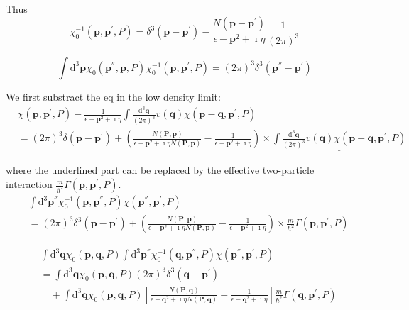 Thus
\[ \chi_0^{-1}(\mathbf{p},\mathbf{p}^{'},P) = \delta^3(\mathbf{p}-\mathbf{p}^{'}) - \frac{N(\mathbf{p}-\mathbf{p}^{'})}{\epsilon-\mathbf{p}^2+\imath \eta} \frac{1}{(2\pi)^3} \]

\[ \int \mathrm{d}^3 \mathbf{p} \chi_0(\mathbf{p}^{''},\mathbf{p},P)\chi_0^{-1}(\mathbf{p},\mathbf{p}^{'},P) = (2\pi)^3 \delta^3(\mathbf{p}^{''}-\mathbf{p}^{'})\]

We first substract the eq in the low density limit:
\[ \begin{split} &\chi(\mathbf{p},\mathbf{p}^{'},P) - \frac{1}{\epsilon-\mathbf{p}^2+\imath \eta} \int \frac{\mathrm{d}^3 \mathbf{q}}{(2\pi)^3} v(\mathbf{q}) \chi(\mathbf{p}-\mathbf{q},\mathbf{p}^{'},P)\\
&=(2\pi)^3 \delta(\mathbf{p}-\mathbf{p}^{'}) + \left( \frac{N(\mathbf{P},\mathbf{p})}{\epsilon - \mathbf{p}^2+\imath \eta N(\mathbf{P},\mathbf{p})} - \frac{1}{\epsilon - \mathbf{p}^2+\imath \eta} \right)\times \underline{\int \frac{\mathrm{d}^3 \mathbf{q}}{(2\pi)^3} v(\mathbf{q})\chi(\mathbf{p}-\mathbf{q},\mathbf{p}^{'},P)}
\end{split} \]

where the underlined part can be replaced by the effective two-particle interaction $\frac{m}{\hbar^2}\Gamma(\mathbf{p},\mathbf{p}^{'},P)$.
\[ \begin{split} &\int \mathrm{d}^3 \mathbf{p}^{''} \chi_0^{-1}(\mathbf{p},\mathbf{p}^{''},P)\chi(\mathbf{p}^{''},\mathbf{p}^{'},P)\\
&=(2\pi)^3 \delta^3(\mathbf{p}-\mathbf{p}^{'}) + \left( \frac{N(\mathbf{P},\mathbf{p})}{\epsilon - \mathbf{p}^2+\imath \eta N(\mathbf{P},\mathbf{p})} - \frac{1}{\epsilon - \mathbf{p}^2+\imath \eta} \right)\times\frac{m}{\hbar^2}\Gamma(\mathbf{p},\mathbf{p}^{'},P)
\end{split} \]

\[ \begin{split} &\int \mathrm{d}^3\mathbf{q} \chi_0(\mathbf{p},\mathbf{q},P) \int \mathrm{d}^3 \mathbf{p}^{''} \chi_0^{-1}(\mathbf{q},\mathbf{p}^{''},P)\chi(\mathbf{p}^{''},\mathbf{p}^{'},P)\\
&= \int \mathrm{d}^3\mathbf{q}\chi_0(\mathbf{p},\mathbf{q},P)(2\pi)^3\delta^3(\mathbf{q}-\mathbf{p}^{'})\\&\quad+ \int \mathrm{d}^3 \mathbf{q} \chi_0(\mathbf{p},\mathbf{q},P) \left[ \frac{N(\mathbf{P},\mathbf{q})}{\epsilon - \mathbf{q}^2+\imath \eta N(\mathbf{P},\mathbf{q})} - \frac{1}{\epsilon - \mathbf{q}^2+\imath \eta} \right] \frac{m}{\hbar^2} \Gamma(\mathbf{q},\mathbf{p}^{'},P)
\end{split} \]


